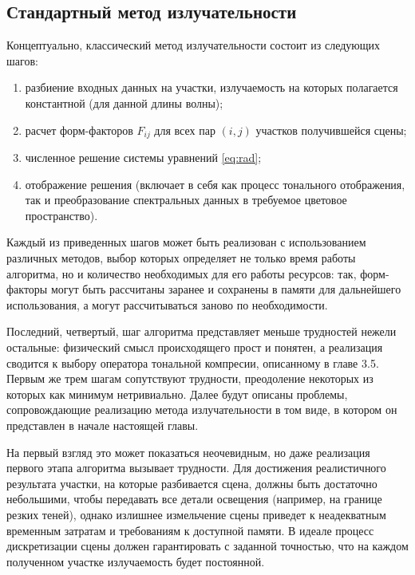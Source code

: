 \documentclass[12pt]{article}
\begin{document}
\subsection{Стандартный метод излучательности}
Концептуально, классический метод излучательности состоит из следующих шагов:
\begin{enumerate}
\item разбиение входных данных на участки, излучаемость на которых полагается константной (для данной длины волны);
\item расчет форм-факторов $F_{ij}$ для всех пар $(i, j)$ участков получившейся сцены;
\item численное решение системы уравнений \eqref{eq:rad};
\item отображение решения (включает в себя как процесс тонального отображения, так и преобразование спектральных данных в требуемое цветовое пространство).
\end{enumerate}

Каждый из приведенных шагов может быть реализован с использованием различных методов, выбор которых определяет не только время работы алгоритма, но и количество необходимых для его работы ресурсов: так, форм-факторы могут быть рассчитаны заранее и сохранены в памяти для дальнейшего использования, а могут рассчитываться заново по необходимости.

Последний, четвертый, шаг алгоритма представляет меньше трудностей нежели остальные: физический смысл происходящего прост и понятен, а реализация сводится к выбору оператора тональной компресии, описанному в главе 3.5. Первым же трем шагам сопутствуют трудности, преодоление некоторых из которых как минимум нетривиально. Далее будут описаны проблемы, сопровождающие реализацию метода излучательности в том виде, в котором он представлен в начале настоящей главы.

На первый взгляд это может показаться неочевидным, но даже реализация первого этапа алгоритма вызывает трудности. Для достижения реалистичного результата участки, на которые разбивается сцена, должны быть достаточно небольшими, чтобы передавать все детали освещения (например, на границе резких теней), однако излишнее измельчение сцены приведет к неадекватным временным затратам и требованиям к доступной памяти. В идеале процесс дискретизации сцены должен гарантировать с заданной точностью, что на каждом полученном участке излучаемость будет постоянной.
\end{document}
